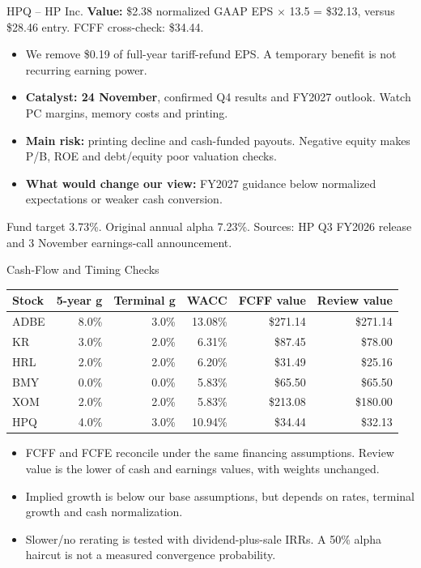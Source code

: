 \documentclass[aspectratio=169,11pt,t]{beamer}
\newcommand{\smnote}[1]{{\footnotesize\color{muted}#1}}
\newcommand{\tight}{\setlength{\itemsep}{0.45em}\setlength{\parskip}{0pt}}
\begin{document}
\begin{frame}{HPQ -- HP Inc.}
\vspace{.1em}
\textbf{Value:} \$2.38 normalized GAAP EPS $\times$ 13.5 = \$32.13, versus \$28.46 entry. FCFF cross-check: \$34.44.
\begin{itemize}\tight
\item We remove \$0.19 of full-year tariff-refund EPS. A temporary benefit is not recurring earning power.
\item \textbf{Catalyst: 24 November}, confirmed Q4 results and FY2027 outlook. Watch PC margins, memory costs and printing.
\item \textbf{Main risk:} printing decline and cash-funded payouts. Negative equity makes P/B, ROE and debt/equity poor valuation checks.
\item \textbf{What would change our view:} FY2027 guidance below normalized expectations or weaker cash conversion.
\end{itemize}
\smnote{Fund target 3.73\%. Original annual alpha 7.23\%. Sources: HP Q3 FY2026 release and 3 November earnings-call announcement.}
\end{frame}
\begin{frame}{Cash-Flow and Timing Checks}
\vspace{.1em}
\small
\begin{tabular}{lrrrrr}\toprule
Stock & 5-year g & Terminal g & WACC & FCFF value & Review value\\\midrule
ADBE&8.0\%&3.0\%&13.08\%&\$271.14&\$271.14\\
KR&3.0\%&2.0\%&6.31\%&\$87.45&\$78.00\\
HRL&2.0\%&2.0\%&6.20\%&\$31.49&\$25.16\\
BMY&0.0\%&0.0\%&5.83\%&\$65.50&\$65.50\\
XOM&2.0\%&2.0\%&5.83\%&\$213.08&\$180.00\\
HPQ&4.0\%&3.0\%&10.94\%&\$34.44&\$32.13\\
\bottomrule\end{tabular}
\begin{itemize}\tight
\item FCFF and FCFE reconcile under the same financing assumptions. Review value is the lower of cash and earnings values, with weights unchanged.
\item Implied growth is below our base assumptions, but depends on rates, terminal growth and cash normalization.
\item Slower/no rerating is tested with dividend-plus-sale IRRs. A 50\% alpha haircut is not a measured convergence probability.
\end{itemize}
\end{frame}
\end{document}
